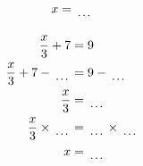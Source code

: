 \documentclass[12pt]{article}
\newcounter{minipagecount}
\begin{document}
\begin{multicols}{2}
\begin{minipage}[t]{0.45\textwidth}
\begin{align*}
        x &= \dotuline{\hspace{5mm}}\\
    \end{align*}
\end{minipage} %
\noindent{(\theminipagecount)}\hspace{0.1mm} %
\begin{minipage}[t]{0.45\textwidth} %
    \vspace{-26pt}  %
    \raggedright %
    \begin{align*} %
        \frac{x}{3} + 7 &= 9\\
        \frac{x}{3} + 7 - \dotuline{\hspace{5mm}} &= 9 - \dotuline{\hspace{5mm}}\\
        \frac{x}{3} &= \dotuline{\hspace{5mm}}\\
        \frac{x}{3} \times\dotuline{\hspace{5mm}} &= \dotuline{\hspace{5mm}} \times\dotuline{\hspace{5mm}}\\
        x &= \dotuline{\hspace{5mm}}\\
    \end{align*}
\end{minipage} %
\noindent{(\theminipagecount)}\hspace{0.1mm} %
\begin{minipage}[t]{0.45\textwidth} %
    \vspace{-26pt}  %

\end{minipage}
\end{multicols}
\end{document}

